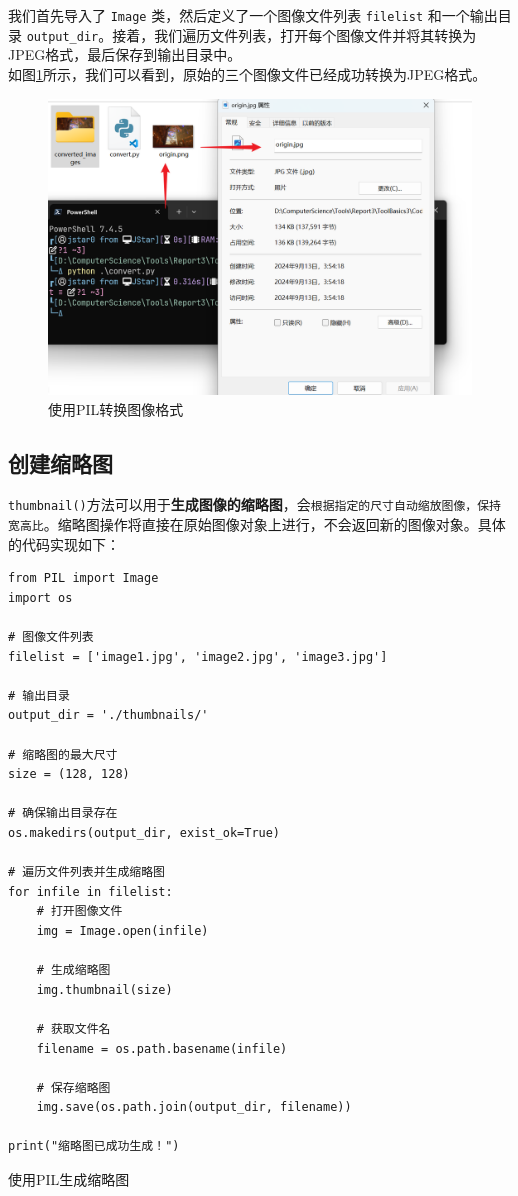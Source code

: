 我们首先导入了 \texttt{Image} 类，然后定义了一个图像文件列表 \texttt{filelist} 和一个输出目录 \texttt{output\_dir}。接着，我们遍历文件列表，打开每个图像文件并将其转换为JPEG格式，最后保存到输出目录中。\\

如图\ref{fig:pilconvert}所示，我们可以看到，原始的三个图像文件已经成功转换为JPEG格式。

\begin{figure}[!h]
    \centering
    \includegraphics[width=.8\textwidth]{./Figures/PIL1.png}
    \caption{使用PIL转换图像格式}
    \label{fig:pilconvert}
\end{figure}

\subsection{创建缩略图}

\texttt{thumbnail()}方法可以用于\textbf{生成图像的缩略图}，会\texttt{根据指定的尺寸自动缩放图像，保持宽高比}。缩略图操作将直接在原始图像对象上进行，不会返回新的图像对象。具体的代码实现如下：

\begin{longlisting}
    \begin{verbatim}
from PIL import Image
import os

# 图像文件列表
filelist = ['image1.jpg', 'image2.jpg', 'image3.jpg']

# 输出目录
output_dir = './thumbnails/'

# 缩略图的最大尺寸
size = (128, 128)

# 确保输出目录存在
os.makedirs(output_dir, exist_ok=True)

# 遍历文件列表并生成缩略图
for infile in filelist:
    # 打开图像文件
    img = Image.open(infile)
    
    # 生成缩略图
    img.thumbnail(size)
    
    # 获取文件名
    filename = os.path.basename(infile)
    
    # 保存缩略图
    img.save(os.path.join(output_dir, filename))

print("缩略图已成功生成！")
    \end{verbatim}
    \caption{使用PIL生成缩略图}
    \label{listing:pilthumbnail}
\end{longlisting}

